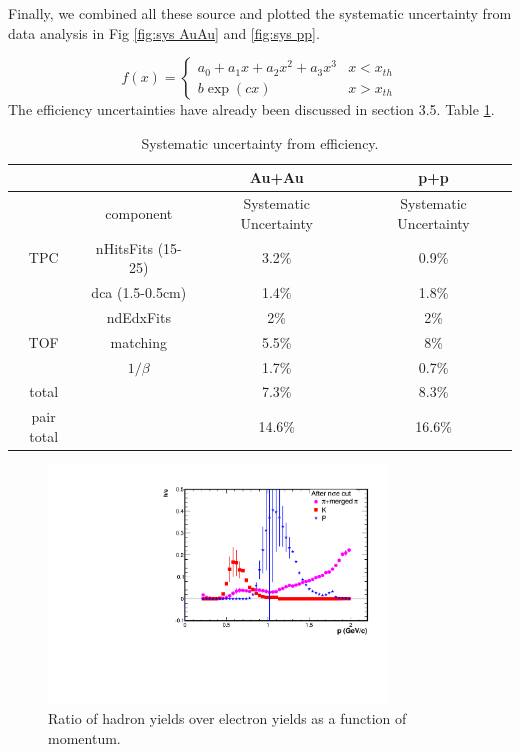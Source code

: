 Finally, we combined all these source and plotted the systematic uncertainty
from data analysis in Fig \ref{fig:sys AuAu} and \ref{fig:sys pp}.

\begin{equation}
f(x)=\begin{cases}
a_{0}+a_{1}x+a_{2}x^{2}+a_{3}x^{3} & x<x_{th}\\
b\exp(cx) & x>x_{th}
\end{cases}\label{eq:h contamination}
\end{equation}
The efficiency uncertainties have already been discussed in section
3.5. Table \ref{table: sys eff}.

\begin{table}
\begin{centering}
\begin{tabular}{c|c|c|c}
\hline 
 &  & Au+Au & p+p\tabularnewline
\hline 
 & component & Systematic Uncertainty & Systematic Uncertainty\tabularnewline
\hline 
\hline 
TPC & nHitsFits (15-25) & 3.2\% & 0.9\%\tabularnewline
\hline 
 & dca (1.5-0.5cm) & 1.4\% & 1.8\%\tabularnewline
\hline 
 & ndEdxFits & 2\% & 2\%\tabularnewline
\hline 
\hline 
TOF & matching & 5.5\% & 8\%\tabularnewline
\hline 
 & $1/\beta$ & 1.7\% & 0.7\%\tabularnewline
\hline 
total &  & 7.3\% & 8.3\%\tabularnewline
\hline 
pair total &  & 14.6\% & 16.6\%\tabularnewline
\hline 
\end{tabular}
\par\end{centering}

\protect\caption{Systematic uncertainty from efficiency.}


\label{table: sys eff}

\end{table}


\begin{figure}
\begin{centering}
\includegraphics[angle=270,width=0.8\textwidth]{fig/3.Analysis/Additional/purity/hadron2Eratio_3}
\par\end{centering}

\protect\caption{Ratio of hadron yields over electron yields as a function of momentum.}


\label{fig:h/e ratio}

\end{figure}


